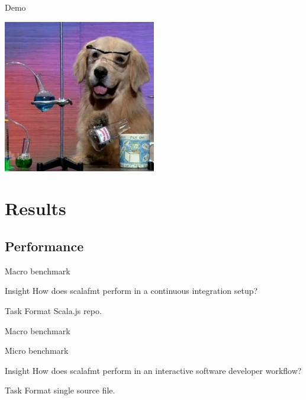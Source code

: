 \documentclass[xcolor=dvipsnames]{beamer}
\theoremstyle{definition}
\begin{document}
\begin{frame}{Demo}
  \begin{center}
    \includegraphics[width=0.5\textwidth]{img/doingdog.jpg}
  \end{center}
\end{frame}


\section{Results} %
\label{sec:Results}

\subsection{Performance}


\begin{frame}{Macro benchmark}
  \begin{block}{Insight}
    How does scalafmt perform in a continuous integration setup?
  \end{block}
  \begin{block}{Task}
    Format Scala.js repo.
  \end{block}
\end{frame}

\begin{frame}{Macro benchmark}
  \begin{table}[H]
    \centering
    
  \end{table}
\end{frame}

\begin{frame}{Micro benchmark}
  \begin{block}{Insight}
     How does scalafmt perform in an interactive software developer workflow?
  \end{block}
  \begin{block}{Task}
    Format single source file.
  \end{block}
\end{frame}
\end{document}
